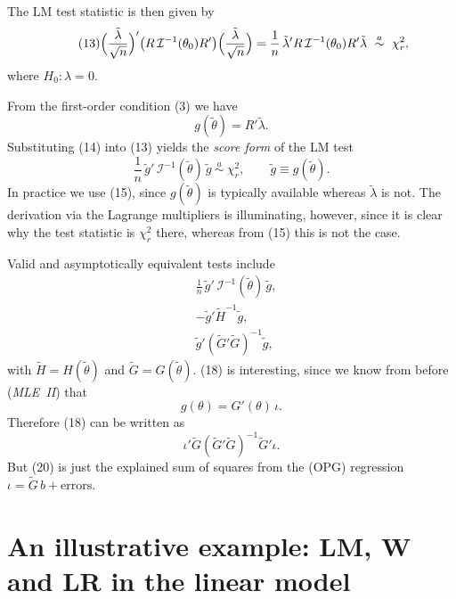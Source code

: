 \documentclass[11pt]{article}
\begin{document}
The LM test statistic is then given by
\begin{equation}\tag{13}
 \Bigl(\frac{\tilde\lambda}{\sqrt n}\Bigr)'\bigl(R\,\mathcal I^{-1}(\theta_{0})R'\bigr)\Bigl(\frac{\tilde\lambda}{\sqrt n}\Bigr)
 =\frac1n\,\tilde\lambda'R\,\mathcal I^{-1}(\theta_{0})R'\tilde\lambda\ \overset{a}{\sim}\ \chi^{2}_{r},
\end{equation}
where $H_{0}\colon\lambda=0$.

From the first-order condition (3) we have
\begin{equation}\tag{14}
 g(\tilde\theta)=R'\tilde\lambda .
\end{equation}
Substituting (14) into (13) yields the \emph{score form} of the LM test
\begin{equation}\tag{15}
 \frac1n\,\tilde g'\,\mathcal I^{-1}(\tilde\theta)\,\tilde g\ \overset{a}{\sim}\ \chi^{2}_{r},
 \qquad\tilde g\equiv g(\tilde\theta).
\end{equation}
In practice we use (15), since $g(\tilde\theta)$ is typically available whereas $\tilde\lambda$ is not. The
derivation via the Lagrange multipliers is illuminating, however, since it is clear why the test
statistic is $\chi^{2}_{r}$ there, whereas from (15) this is not the case.

Valid and asymptotically equivalent tests include
\begin{align}
 &\frac1n\,\tilde g'\,\mathcal I^{-1}(\tilde\theta)\,\tilde g, \tag{16}\\
 &-\tilde g'\tilde H^{-1}\tilde g, \tag{17}\\
 &\tilde g'(\tilde G'\tilde G)^{-1}\tilde g, \tag{18}
\end{align}
with $\tilde H=H(\tilde\theta)$ and $\tilde G=G(\tilde\theta)$. (18) is interesting, since we know from before
(\emph{MLE~II}) that
\begin{equation}\tag{19}
 g(\theta)=G'(\theta)\,\iota .
\end{equation}
Therefore (18) can be written as
\begin{equation}\tag{20}
 \iota'\tilde G(\tilde G'\tilde G)^{-1}\tilde G'\iota .
\end{equation}
But (20) is just the explained sum of squares from the (OPG) regression
$\iota=\tilde G\,b+\text{errors}$.

\section{An illustrative example: LM, W and LR in the linear model}
\end{document}
